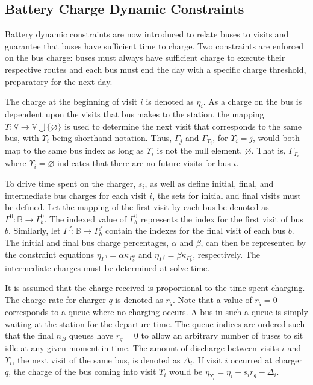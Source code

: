 \documentclass[utf8]{FrontiersinHarvard}
\begin{document}
\subsection{Battery Charge Dynamic Constraints}
\label{sec:batt_dynamics}
Battery dynamic constraints are now introduced to relate buses to visits and guarantee that buses have sufficient time
to charge. Two constraints are enforced on the bus charge: buses must always have sufficient charge to execute their
respective routes and each bus must end the day with a specific charge threshold, preparatory for the next day.

The charge at the beginning of visit \(i\) is denoted as \(\eta_i\). As a charge on the bus is dependent upon the visits that
bus makes to the station, the mapping \(\Upsilon: \mathbb{V} \rightarrow \mathbb{V} \bigcup \{\varnothing\}\) is used to determine the next visit
that corresponds to the same bus, with \(\Upsilon_i\) being shorthand notation. Thus, \(\Gamma_j\) and \(\Gamma_{\Upsilon_i}\), for \(\Upsilon_i = j\), would
both map to the same bus index as long as \(\Upsilon_i\) is not the null element, \(\varnothing\). That is, \(\Gamma_{\Upsilon_i}\) where \(\Upsilon_i =
\varnothing\) indicates that there are no future visits for bus \(i\).

To drive time spent on the charger, \(s_i\), as well as define initial, final, and intermediate bus charges for each visit
\(i\), the sets for initial and final visits must be defined. Let the mapping of the first visit by each bus be denoted as
\(\Gamma^0 : \mathbb{B} \rightarrow \Gamma^0_b\). The indexed value of \(\Gamma^0_b\) represents the index for the first visit of bus \(b\). Similarly,
let \(\Gamma^f : \mathbb{B} \rightarrow \Gamma_b^f\) contain the indexes for the final visit of each bus \(b\). The initial and final bus charge
percentages, \(\alpha\) and \(\beta\), can then be represented by the constraint equations \(\eta_{\Gamma^0} = \alpha \kappa_{\Gamma^0_b}\) and \(\eta_{\Gamma^f} = \beta
\kappa_{\Gamma^f_b}\), respectively. The intermediate charges must be determined at solve time.

It is assumed that the charge received is proportional to the time spent charging. The charge rate for charger \(q\) is
denoted as \(r_q\). Note that a value of \(r_q = 0\) corresponds to a queue where no charging occurs. A bus in such a queue
is simply waiting at the station for the departure time. The queue indices are ordered such that the final \(n_B\) queues
have \(r_q = 0\) to allow an arbitrary number of buses to sit idle at any given moment in time. The amount of discharge
between visits \(i\) and \(\Upsilon_i\), the next visit of the same bus, is denoted as \(\Delta_i\). If visit \(i\) occurred at charger \(q\),
the charge of the bus coming into visit \(\Upsilon_i\) would be \(\eta_{\Upsilon_i} = \eta_i + s_i r_q - \Delta_i\).
\end{document}
